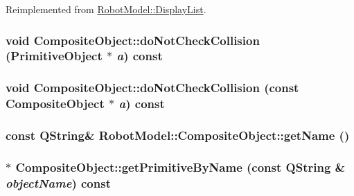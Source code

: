 Reimplemented from \hyperlink{class_robot_model_1_1_display_list_a023ba88eaac38b26dc9ea6a358467637}{RobotModel::DisplayList}.\hypertarget{class_robot_model_1_1_composite_object_a788711732ec5994c3f3a09321e2c5a18}{
\subsubsection[{doNotCheckCollision}]{\setlength{\rightskip}{0pt plus 5cm}void CompositeObject::doNotCheckCollision ({\bf PrimitiveObject} $\ast$ {\em a}) const}}
\label{class_robot_model_1_1_composite_object_a788711732ec5994c3f3a09321e2c5a18}
\hypertarget{class_robot_model_1_1_composite_object_ab6dc53258a7cdb53a22af63688d50ddd}{
\subsubsection[{doNotCheckCollision}]{\setlength{\rightskip}{0pt plus 5cm}void CompositeObject::doNotCheckCollision (const {\bf CompositeObject} $\ast$ {\em a}) const}}
\label{class_robot_model_1_1_composite_object_ab6dc53258a7cdb53a22af63688d50ddd}
\hypertarget{class_robot_model_1_1_composite_object_a893e71523b76afc186796fc95ead70d7}{
\subsubsection[{getName}]{\setlength{\rightskip}{0pt plus 5cm}const QString\& RobotModel::CompositeObject::getName ()}}
\label{class_robot_model_1_1_composite_object_a893e71523b76afc186796fc95ead70d7}
\hypertarget{class_robot_model_1_1_composite_object_ad02b7a8e84453fb433d5efaac80333c9}{
\subsubsection[{getPrimitiveByName}]{ $\ast$ CompositeObject::getPrimitiveByName (const QString \& {\em objectName}) const}}
